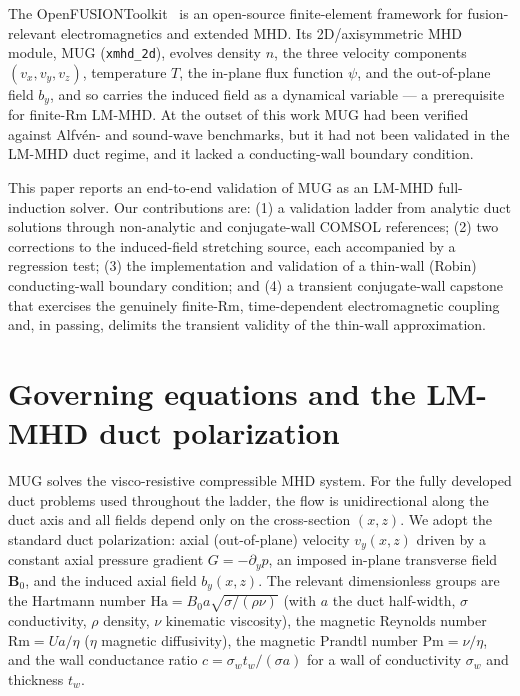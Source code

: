 \documentclass[11pt,letterpaper]{article}
\newcommand{\Ha}{\mathrm{Ha}}
\newcommand{\Rm}{\mathrm{Rm}}
\newcommand{\Pm}{\mathrm{Pm}}
\newcommand{\by}{b_y}
\begin{document}
The OpenFUSIONToolkit~\cite{oft} is an open-source finite-element framework for
fusion-relevant electromagnetics and extended MHD. Its 2D/axisymmetric MHD module,
MUG (\texttt{xmhd\_2d}), evolves density $n$, the three velocity components
$(v_x,v_y,v_z)$, temperature $T$, the in-plane flux function $\psi$, and the
out-of-plane field $\by$, and so carries the induced field as a dynamical variable
--- a prerequisite for finite-$\Rm$ LM-MHD. At the outset of this work MUG had been
verified against Alfv\'en- and sound-wave benchmarks, but it had not been
validated in the LM-MHD duct regime, and it lacked a conducting-wall boundary
condition.

This paper reports an end-to-end validation of MUG as an LM-MHD full-induction
solver. Our contributions are: (1) a validation ladder from analytic duct
solutions through non-analytic and conjugate-wall COMSOL references; (2) two
corrections to the induced-field stretching source, each accompanied by a
regression test; (3) the implementation and validation of a thin-wall (Robin)
conducting-wall boundary condition; and (4) a transient conjugate-wall capstone
that exercises the genuinely finite-$\Rm$, time-dependent electromagnetic coupling
and, in passing, delimits the transient validity of the thin-wall approximation.

\section{Governing equations and the LM-MHD duct polarization}
MUG solves the visco-resistive compressible MHD system. For the fully developed
duct problems used throughout the ladder, the flow is unidirectional along the
duct axis and all fields depend only on the cross-section $(x,z)$. We adopt the
standard duct polarization: axial (out-of-plane) velocity $v_y(x,z)$ driven by a
constant axial pressure gradient $G=-\partial_y p$, an imposed in-plane transverse
field $\mathbf{B}_0$, and the induced axial field $\by(x,z)$. The relevant
dimensionless groups are the Hartmann number $\Ha=B_0 a\sqrt{\sigma/(\rho\nu)}$
(with $a$ the duct half-width, $\sigma$ conductivity, $\rho$ density, $\nu$
kinematic viscosity), the magnetic Reynolds number $\Rm=Ua/\eta$ ($\eta$ magnetic
diffusivity), the magnetic Prandtl number $\Pm=\nu/\eta$, and the wall conductance
ratio $c=\sigma_w t_w/(\sigma a)$ for a wall of conductivity $\sigma_w$ and
thickness $t_w$.
\end{document}
